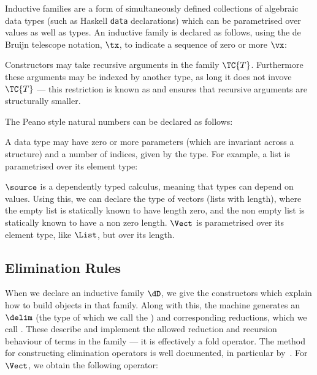 Inductive families \cite{dybjer94} are a form of simultaneously
defined collections of algebraic data types (such as Haskell
\texttt{data} declarations) which can be parametrised over values as
well as types.  An inductive family is declared as follows, using
the de Bruijn telescope notation, $\tx$, to indicate a sequence of
zero or more $\vx$:


Constructors may take recursive arguments in the family
$\TC{T}$. Furthermore these arguments may be indexed by another type,
as long it does not invove $\TC{T}$ --- this restriction is known as
 and ensures that recursive arguments are
structurally smaller.

The Peano style natural numbers can be declared as follows:

\DM{
\Data\:\Nat\Hab\Type\:=\:\Z\Hab\Nat\:\mid\:\suc\Hab\fbind{\vk}{\Nat}{\Nat}
}

A data type may have zero or more parameters (which are invariant
across a structure) and a number of indices, given by the type. For
example, a list is parametrised over its element type:

\DM{
\AR{
\Data\:\List\:(\vA\Hab\Type)\Hab\Type\\
\hg\AR{
=\:\nil\Hab\List\:\vA\\
\mid\:\cons\Hab\fbind{\vx}{\vA}{\fbind{\vxs}{\List\:\vA}{\List\:\vA}}
}
}
}

$\source$ is a dependently typed calculus, meaning that types can
depend on values. Using this, we can declare the type of vectors
(lists with length), where the empty list is statically known to have
length zero, and the non empty list is statically known to have a non
zero length. $\Vect$ is parametrised over its element type, like
$\List$, but  over its length. 

\DM{
\AR{
\Data\:\Vect\:(\vA\Hab\Type)\Hab\Nat\to\Type\\
\hg\AR{
=\:\Vnil\Hab\Vect\:\vA\:\Z\\
\mid\:\Vcons\Hab\fbind{\vk}{\Nat}{
\fbind{\vx}{\vA}{\fbind{\vxs}{\Vect\:\vA\:\vk}{\Vect\:\vA\:(\suc\:\vk)}}
}
}
}
}

\subsection{Elimination Rules}

When we declare an inductive family $\dD$, we give the constructors
which explain how to build objects in that family. Along with this,
the machine generates an  $\delim$ (the
type of which we call the ) and corresponding
reductions, which we call
. These
describe and implement the allowed reduction and recursion behaviour
of terms in the family --- it is effectively a fold operator.  The
method for constructing elimination operators is well documented, in
particular by~\cite{dybjer94,luo94,mcbride-thesis}.
For $\Vect$, we obtain the following operator:

